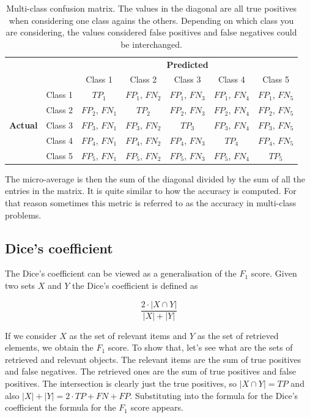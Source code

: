 \begin{table}[ht]
\centering
\caption{Multi-class confusion matrix. The values in the diagonal are all true positives when considering one class agains the others. Depending on which class you are considering, the values considered false positives and false negatives could be interchanged.}
\begin{tabular}{c c c|c|c|c|c|}
& & \multicolumn{5}{c}{\textbf{Predicted}} \\ \cline{3-7}
& & \multicolumn{1}{|c|}{Class 1} & Class 2 & Class 3 & Class 4 & Class 5 \\ \cline{2-7}
\multirow{5}{*}{\textbf{Actual}} 
 & \multicolumn{1}{|c|}{Class 1} & $TP_1$ & $FP_1$, $FN_2$ & $FP_1$, $FN_3$ & $FP_1$, $FN_4$ & $FP_1$, $FN_5$ \\ \cline{2-7}
 & \multicolumn{1}{|c|}{Class 2} & $FP_2$, $FN_1$ & $TP_2$ & $FP_2$, $FN_3$ & $FP_2$, $FN_4$ & $FP_2$, $FN_5$ \\ \cline{2-7}
 & \multicolumn{1}{|c|}{Class 3} & $FP_3$, $FN_1$ & $FP_3$, $FN_2$ & $TP_3$ & $FP_3$, $FN_4$ & $FP_3$, $FN_5$ \\ \cline{2-7}
 & \multicolumn{1}{|c|}{Class 4} & $FP_4$, $FN_1$ & $FP_4$, $FN_2$ & $FP_4$, $FN_3$ & $TP_4$ & $FP_4$, $FN_5$ \\ \cline{2-7}
 & \multicolumn{1}{|c|}{Class 5} & $FP_5$, $FN_1$ & $FP_5$, $FN_2$ & $FP_5$, $FN_3$ & $FP_5$, $FN_4$ & $TP_5$ \\ \cline{2-7}
\end{tabular}
\label{table:confusion_matrix3}
\end{table}

The micro-average is then the sum of the diagonal divided by the sum of all the entries in the matrix. It is quite similar to how the accuracy is computed. For that reason sometimes this metric is referred to as the accuracy in multi-class problems.

\newpage
\subsection{Dice's coefficient}\label{subsec:dice}

The Dice's coefficient can be viewed as a generalisation of the $F_1$ score. Given two sets $X$ and $Y$ the Dice's coefficient is defined as 

\begin{equation}
    \frac{2\cdot |X \cap Y|}{|X| + |Y|}
\end{equation}

If we consider $X$ as the set of relevant items and $Y$ as the set of retrieved elements, we obtain the $F_1$ score. To show that, let's see what are the sets of retrieved and relevant objects. The relevant items are the sum of true positives and false negatives. The retrieved ones are the sum of true positives and false positives. The intersection is clearly just the true positives, so $|X\cap Y| = TP$ and also $|X|+|Y|=2\cdot TP + FN + FP$. Substituting into the formula for the Dice's coefficient the formula for the $F_1$ score appears.

